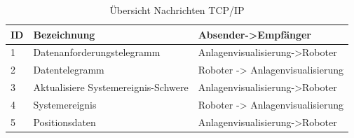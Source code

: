 \documentclass[ a4paper,
                oneside,
                toc=bibliography,
                toc=listof
                ]{scrbook}
\begin{document}
	\begin{longtable}{p{0.5cm}p{6.5cm}p{6cm}}
		\caption{Übersicht Nachrichten TCP/IP}
		\label{table:NachrichtenTCPIP}\\
		\hline
		ID & Bezeichnung & Absender->Empfänger  \\ [0.5ex] 
		\hline
		\endhead
		1 & Datenanforderungstelegramm & Anlagenvisualisierung->Roboter \\ 
		2 & Datentelegramm & Roboter -> Anlagenvisualisierung \\
		3 & Aktualisiere Systemereignis-Schwere & Anlagenvisualisierung->Roboter \\
		4 & Systemereignis & Roboter -> Anlagenvisualisierung \\
		5 & Positionsdaten & Anlagenvisualisierung->Roboter \\

		\hline
	\end{longtable}
	
	
\end{document}
